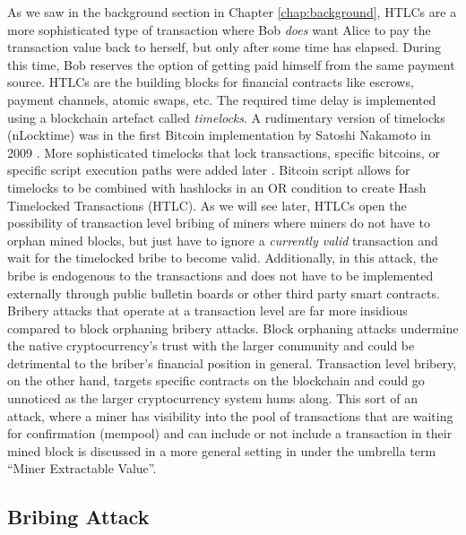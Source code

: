 As we saw in the background section in Chapter \ref{chap:background}, HTLCs are a more sophisticated type of transaction where Bob \emph{does} want Alice to pay the transaction value back to herself, but only after some time has elapsed. During this time, Bob reserves the option of getting paid himself from the same payment source. HTLCs are the building blocks for financial contracts like escrows, payment channels, atomic swaps, etc. The required time delay is implemented using a blockchain artefact called \emph{timelocks}. A rudimentary version of timelocks (nLocktime) was in the first Bitcoin implementation by Satoshi Nakamoto in 2009 \cite{satoshi_bitcoin_release_0_1_0}. More sophisticated timelocks that lock transactions, specific bitcoins, or specific script execution paths were added later \cite{BIP68} \cite{BIP65} \cite{BIP112}. Bitcoin script allows for timelocks to be combined with hashlocks in an OR condition to create Hash Timelocked Transactions (HTLC). As we will see later, HTLCs open the possibility of transaction level bribing of miners where miners do not have to orphan mined blocks, but just have to ignore a \emph{currently valid} transaction and wait for the timelocked bribe to become valid. Additionally, in this attack, the bribe is endogenous to the transactions and does not have to be implemented externally through public bulletin boards or other third party smart contracts. Bribery attacks that operate at a transaction level are far more insidious compared to block orphaning bribery attacks. Block orphaning attacks undermine the native cryptocurrency's trust with the larger community and could be detrimental to the briber's financial position in general. Transaction level bribery, on the other hand, targets specific contracts on the blockchain and could go unnoticed as the larger cryptocurrency system hums along. This sort of an attack, where a miner has visibility into the pool of transactions that are waiting for confirmation (mempool) and can include or not include a transaction in their mined block is discussed in a more general setting in \cite{daian2020flash} under the umbrella term ``Miner Extractable Value''.

\subsection{Bribing Attack}

